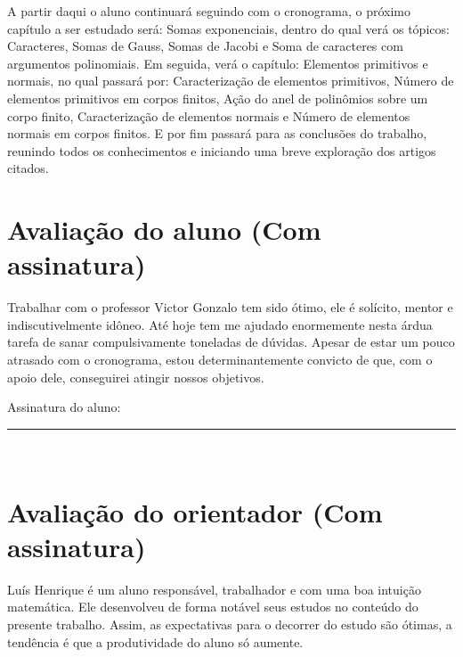 \documentclass[12pt,twoside]{article}
\begin{document}
    A partir daqui o aluno continuará seguindo com o cronograma, o próximo capítulo a ser estudado será: Somas exponenciais,
    dentro do qual verá os tópicos: Caracteres, Somas de Gauss, Somas de Jacobi e Soma de caracteres com argumentos
    polinomiais. Em seguida, verá o capítulo: Elementos primitivos e normais, no qual passará por: Caracterização de
    elementos primitivos, Número de elementos primitivos em corpos finitos, Ação do anel de polinômios sobre um corpo
    finito, Caracterização de elementos normais e Número de elementos normais em corpos finitos. E por fim passará para
    as conclusões do trabalho, reunindo todos os conhecimentos e iniciando uma breve exploração dos artigos citados. \\
    

  \section{Avaliação do aluno (Com assinatura)}
    Trabalhar com o professor Victor Gonzalo tem sido ótimo, ele é solícito, mentor e indiscutivelmente idôneo. Até hoje tem me
    ajudado enormemente nesta árdua tarefa de sanar compulsivamente toneladas de dúvidas. Apesar de estar um pouco atrasado
    com o cronograma, estou determinantemente convicto de que, com o apoio dele, conseguirei atingir nossos objetivos.
    
    \vspace*{1cm} Assinatura do aluno: \ \rule{8cm}{1pt} \\
    
    \newpage %

  \section{Avaliação do orientador (Com assinatura)}
    Luís Henrique é um aluno responsável, trabalhador e com uma boa intuição matemática. Ele desenvolveu de forma 
    notável seus estudos no conteúdo do presente trabalho. Assim, as expectativas para o decorrer do estudo são ótimas, 
    a tendência é que a produtividade do aluno só aumente. 
    
\end{document}
